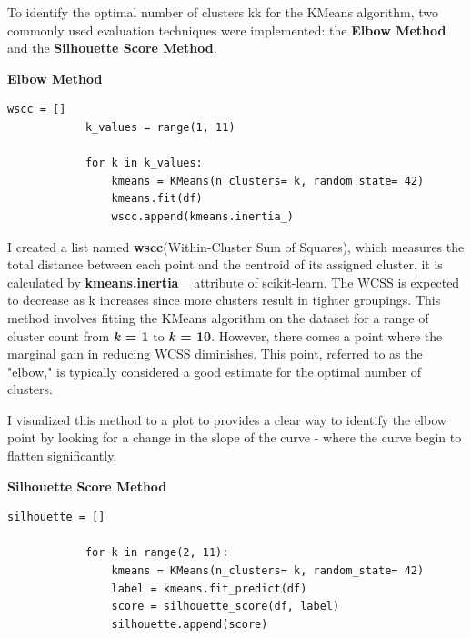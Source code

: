 \documentclass[a4paper,12pt]{article}
\begin{document}
\begin{itemize}[label= {*}, leftmargin= 1cm]
\begin{itemize}[label= {}, leftmargin= 1cm]
        To identify the optimal number of clusters kk for the KMeans algorithm, two commonly used evaluation techniques were implemented: the \textbf{Elbow Method} and the \textbf{Silhouette Score Method}.
        \vspace{0.3cm}
        
        \textbf{Elbow Method}
        \begin{Verbatim}[xleftmargin=-1cm]
            wscc = []
            k_values = range(1, 11)
            
            for k in k_values:
                kmeans = KMeans(n_clusters= k, random_state= 42)
                kmeans.fit(df)
                wscc.append(kmeans.inertia_)
        \end{Verbatim}  
        \vspace{0.3cm}
        
        I created a list named \textbf{wscc}(Within-Cluster Sum of Squares), which measures the total distance between each point and the centroid of its assigned cluster, it is calculated by \textbf{kmeans.inertia\_} attribute of scikit-learn. The WCSS is expected to decrease as k increases since more clusters result in tighter groupings. This method involves fitting the KMeans algorithm on the dataset for a range of cluster count from \textbf{\textit{k} = 1} to \textbf{\textit{k} = 10}. However, there comes a point where the marginal gain in reducing WCSS diminishes. This point, referred to as the "elbow," is typically considered a good estimate for the optimal number of clusters.
        \vspace{0.3cm}

        I visualized this method to a plot to provides a clear way to identify the elbow point by looking for a change in the slope of the curve - where the curve begin to flatten significantly.
        \vspace{0.5cm}

        \textbf{Silhouette Score Method}
        \begin{Verbatim}[xleftmargin=-1cm]
            silhouette = []

            for k in range(2, 11):
                kmeans = KMeans(n_clusters= k, random_state= 42)
                label = kmeans.fit_predict(df)
                score = silhouette_score(df, label)
                silhouette.append(score)
        \end{Verbatim}  
        \vspace{0.3cm}
        

\end{itemize}
\end{itemize}
\end{document}
